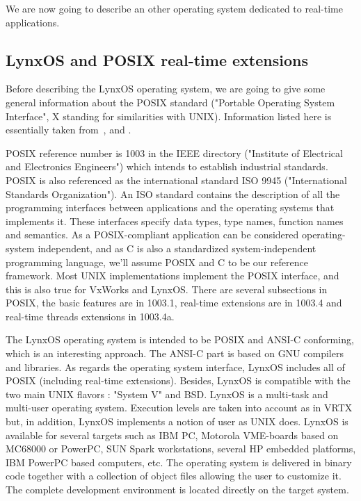 \documentclass[10pt]{report}
\begin{document}
We are now going to describe an other operating system dedicated
to real-time applications.

\subsection{LynxOS and POSIX real-time extensions}

Before describing the LynxOS operating system, we are going to give
some general information about the POSIX standard ("Portable
Operating System Interface", X standing for similarities with
UNIX). Information listed here is essentially taken from~\cite{LYNX}, \cite{JMR:93} and \cite{JMR:94}.

POSIX reference number is 1003 in the IEEE directory ("Institute
of Electrical and Electronics Engineers") which intends to
establish industrial standards. POSIX is also referenced as the
international standard ISO 9945 ("International Standards
Organization"). An ISO standard contains the description of all
the programming interfaces between applications and the operating systems that
implements it. These interfaces specify data types, type names,
function names and semantics. As a POSIX-compliant application can
be considered operating-system independent, and as C is also a
standardized system-independent programming language, we'll
assume POSIX and C to be our reference framework. Most UNIX
implementations implement the POSIX interface, and this is also
true for VxWorks and LynxOS. There are several subsections in
POSIX, the basic features are in 1003.1, real-time extensions are
in 1003.4 and real-time threads extensions in 1003.4a.

The LynxOS operating system is intended to be POSIX and ANSI-C
conforming, which is an interesting approach. The ANSI-C part is
based on GNU compilers and libraries. As regards the operating
system interface, LynxOS includes all of POSIX (including real-time
extensions). Besides, LynxOS is compatible with the two main UNIX
flavors : "System V" and BSD. LynxOS is a multi-task and
multi-user operating system. Execution levels are taken into account as in 
VRTX but, in addition, LynxOS implements a notion of user as UNIX does. 
LynxOS is available for several targets such as IBM PC,
Motorola VME-boards based on MC68000 or PowerPC, SUN Spark
workstations, several HP embedded platforms, IBM PowerPC based
computers, etc. The operating system is delivered in binary code
together with a collection of object files allowing the user to customize
it. The complete development environment is located directly on
the target system.
\end{document}
